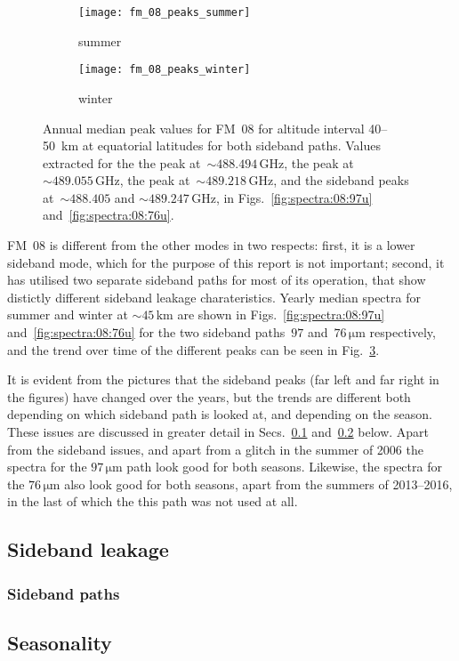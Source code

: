 \begin{figure}[ht]
    \centering
    \begin{subfigure}[b]{0.9545\textwidth}
        \texttt{[image: fm\_08\_peaks\_summer]}
        \caption{summer}\label{fig:peaks:08:summer}
    \end{subfigure}
    \begin{subfigure}[b]{0.9545\textwidth}
        \texttt{[image: fm\_08\_peaks\_winter]}
        \caption{winter}\label{fig:peaks:08:winter}
    \end{subfigure}
    \caption{Annual median peak values for FM~08 for altitude interval
        40--50~km at equatorial latitudes for both sideband paths.
        Values extracted for the the  peak
        at~$\sim488.494\,\mathrm{GHz}$, the  peak
        at~$\sim489.055\,\mathrm{GHz}$, the  peak
        at~$\sim489.218\,\mathrm{GHz}$, and the  sideband peaks
        at~$\sim488.405$ and $\sim489.247\,\mathrm{GHz}$,
        in Figs.~\ref{fig:spectra:08:97u} and~\ref{fig:spectra:08:76u}.
        }\label{fig:peaks:08}
\end{figure}

\noindent
FM~08 is different from the other modes in two respects: first, it is a lower
sideband mode, which for the purpose of this report is not important; second,
it has utilised two separate sideband paths for most of its operation, that
show distictly different sideband leakage charateristics.  Yearly median
spectra for summer and winter at $\sim45\,\mathrm{km}$ are shown in
Figs.~\ref{fig:spectra:08:97u} and~\ref{fig:spectra:08:76u} for the two
sideband paths~$97$ and~$76\,\mathrm{\mu m}$ respectively, and the trend over
time of the different peaks can be seen in Fig.~\ref{fig:peaks:08}.

It is evident from the pictures that the sideband peaks (far left and far right
in the figures) have changed over the years, but the trends are different both
depending on which sideband path is looked at, and depending on the season.
These issues are discussed in greater detail in Secs.~\ref{FM08:sbl}
and~\ref{FM08:seasonality} below.  Apart from the sideband issues, and apart
from a glitch in the summer of 2006 the spectra for the $97\,\mathrm{\mu m}$
path look good for both seasons.  Likewise, the spectra for the
$76\,\mathrm{\mu m}$ also look good for both seasons, apart from the summers of
2013--2016, in the last of which the this path was not used at all.


\subsection{Sideband leakage}
\label{FM08:sbl}

\subsubsection{Sideband paths}
\label{FM08:sidebandpaths}

\subsection{Seasonality}
\label{FM08:seasonality}
